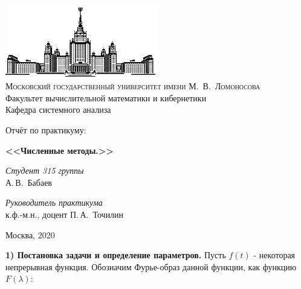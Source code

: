 \documentclass[11pt]{article}
\begin{document}
	
	\thispagestyle{empty}
	
	\begin{center}
		\ \vspace{-3cm}
		
		\includegraphics[width=0.5\textwidth]{msu.eps}\\
		{\scshape Московский государственный университет имени М.~В.~Ломоносова}\\
		Факультет вычислительной математики и кибернетики\\
		Кафедра системного анализа
		
		\vfill
		
		{\LARGE Отчёт по  практикуму:}
		
		\vspace{1cm}
		
		{\Huge\bfseries <<Численные методы.>>}
	\end{center}
	
	\vspace{1cm}
	
	\begin{flushright}
		\large
		\textit{Студент 315 группы}\\
		А.\,В.~Бабаев
		
		\vspace{5mm}
		
		\textit{Руководитель практикума}\\
		к.ф.-м.н., доцент П.\,А.~Точилин
	\end{flushright}
	
	\vfill
	
	\begin{center}
		Москва, 2020
	\end{center}
	
	\newpage
	
	{\vspace*{-2cm} \hspace{-1cm}\bf \Large  1) Постановка задачи и определение параметров.}
	\newline
	\newline
	{\hspace{-0.6cm} Пусть $f(t)$ - некоторая непрерывная функция. Обозначим Фурье-образ данной функции,	 как функцию $F(\lambda)$:}
	\newline
	
\end{document}
